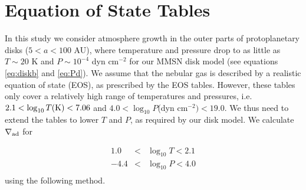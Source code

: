 \documentclass[apj]{emulateapj}
\newcommand{\delad}{\nabla_{\rm ad}}
\begin{document}
 





\appendix
\section{Equation of State Tables}\label{EOStables}

In this study we consider atmosphere growth in the outer parts of protoplanetary disks ($5<a<100$ AU), where temperature and pressure drop to as little as $T \sim 20$ K and $P \sim10^{-4}$ dyn cm$^{-2}$ for our MMSN disk model (see equations \ref{eq:diskb} and \ref{eq:Pd}). We assume that the nebular gas is described by a realistic equation of state (EOS), as prescribed by the \citet{saumon95} EOS tables. However, these tables only cover a relatively high range of temperatures and pressures, i.e. $2.1 < \log_{10} T(\rm{K})<7.06$ and $4.0<\log_{10}P$(dyn cm$^{-2})<19.0$. We thus need to extend the tables to lower $T$ and $P$, as required by our disk model. We calculate $\delad$ for

\begin{eqnarray}
1.0 & < & \log_{10} T <2.1 \\ 
-4.4& < & \log_{10} P<4.0 \\
\end{eqnarray} 
using the following method.



\end{document}

